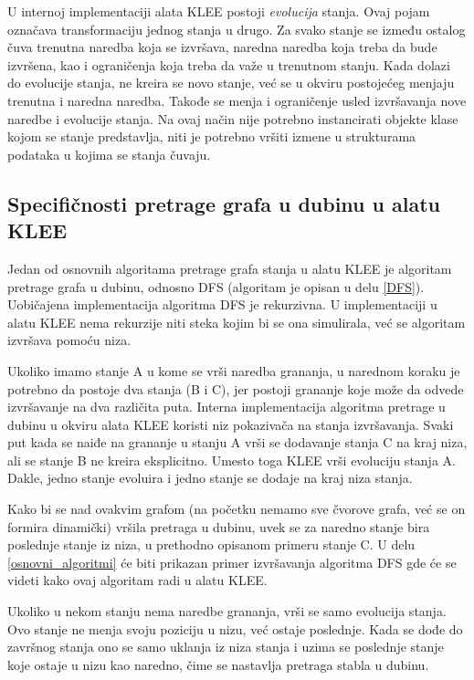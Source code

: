 \documentclass[12pt,oneside]{memoir}
\begin{document}
U internoj implementaciji alata KLEE postoji \textit{evolucija} stanja. Ovaj pojam označava transformaciju jednog stanja u drugo. Za svako stanje se između ostalog čuva trenutna naredba koja se izvršava, naredna naredba koja treba da bude izvršena, kao i ograničenja koja treba da važe u trenutnom stanju. Kada dolazi do evolucije stanja, ne kreira se novo stanje, već se u okviru postojećeg menjaju trenutna i naredna naredba. Takođe se menja i ograničenje usled izvršavanja nove naredbe i evolucije stanja. Na ovaj način nije potrebno instancirati objekte klase kojom se stanje predstavlja, niti je potrebno vršiti izmene u strukturama podataka u kojima se stanja čuvaju.

\subsection{Specifičnosti pretrage grafa u dubinu u alatu KLEE}
Jedan od osnovnih algoritama pretrage grafa stanja u alatu KLEE je algoritam pretrage grafa u dubinu, odnosno DFS (algoritam je opisan u delu \ref{DFS}). Uobičajena implementacija algoritma DFS je rekurzivna. U implementaciji u alatu KLEE nema rekurzije niti steka kojim bi se ona simulirala, već se algoritam izvršava pomoću niza.

Ukoliko imamo stanje A u kome se vrši naredba grananja, u narednom koraku je potrebno da postoje dva stanja (B i C), jer postoji grananje koje može da odvede izvršavanje na dva različita puta. Interna implementacija algoritma pretrage u dubinu u okviru alata KLEE koristi niz pokazivača na stanja izvršavanja. Svaki put kada se naiđe na grananje u stanju A vrši se dodavanje stanja C na kraj niza, ali se stanje B ne kreira eksplicitno. Umesto toga KLEE vrši evoluciju stanja A. Dakle, jedno stanje evoluira i jedno stanje se dodaje na kraj niza stanja. 

Kako bi se nad ovakvim grafom (na početku nemamo sve čvorove grafa, već se on formira dinamički) vršila pretraga u dubinu, uvek se za naredno stanje bira poslednje stanje iz niza, u prethodno opisanom primeru stanje C. U delu \ref{osnovni_algoritmi} će biti prikazan primer izvršavanja algoritma DFS gde će se videti kako ovaj algoritam radi u alatu KLEE. 

Ukoliko u nekom stanju nema naredbe grananja, vrši se samo evolucija stanja. Ovo stanje ne menja svoju poziciju u nizu, već ostaje poslednje. Kada se dođe do završnog stanja ono se samo uklanja iz niza stanja i uzima se poslednje stanje koje ostaje u nizu kao naredno, čime se nastavlja pretraga stabla u dubinu. 
\end{document}
